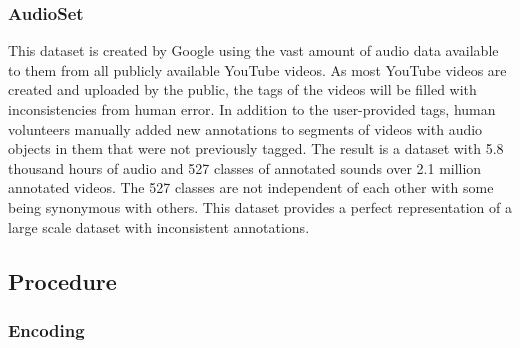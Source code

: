 \subsubsection{AudioSet}
This dataset is created by Google using the vast amount of audio data available to them from all publicly available YouTube videos. As most YouTube videos are created and uploaded by the public, the tags of the videos will be filled with inconsistencies from human error. In addition to the user-provided tags, human volunteers manually added new annotations to segments of videos with audio objects in them that were not previously tagged. The result is a dataset with 5.8 thousand hours of audio and 527 classes of annotated sounds over 2.1 million annotated videos. The 527 classes are not independent of each other with some being synonymous with others. This dataset provides a perfect representation of a large scale dataset with inconsistent annotations.

\subsection{Procedure}


\subsubsection{Encoding}


